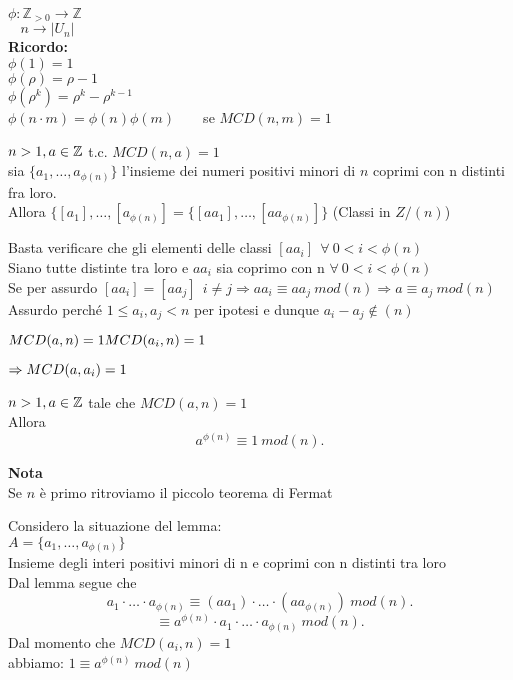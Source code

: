 \documentclass[12px]{article}
\begin{document}
	$\phi: \mathbb Z_{>0} \rightarrow \mathbb Z$\\
	$\text{} \ \ \ \ n \rightarrow |U_n|$\\
	\textbf{Ricordo:}\\
	$\phi(1) = 1$\\
	 $\phi(\rho) = \rho -1$\\
	 $\phi(\rho^k) = \rho^k - \rho ^{k-1}$\\
	 $\phi(n\cdot m) = \phi(n)\phi(m)$\ \ \ \ se  $MCD(n,m) = 1$\\
	  \begin{lemm}
	 	$n>1, a\in\mathbb{Z}$ t.c.  $MCD(n,a) = 1$\\
		sia  $\{a_1,\ldots,a_{\phi(n)}\}$ l'insieme dei numeri positivi minori di $n$ coprimi con n distinti fra loro.\\
		Allora $\{[a_1],\ldots,[a_{\phi(n)}] = \{[aa_1],\ldots, [aa_{\phi(n)}]\}$ (Classi in $Z/(n)$)
	 \end{lemm}
	 \begin{dimo}
		 Basta verificare che gli elementi delle classi $[aa_i] \ \ \forall \ 0<i<\phi(n)$\\
		 Siano tutte distinte tra loro e  $aa_i$ sia coprimo con n  $\forall \ 0<i<\phi(n)$ \\
		 Se per assurdo $[aa_i] = [aa_j] \ \ i\neq j \Rightarrow aa_i\equiv aa_j\  mod(n) \Rightarrow a\equiv a_j \ mod(n)$ Assurdo perché $1\leq a_i, a_j< n$ per ipotesi e dunque  $a_i-a_j\not\in (n)$\\
		 \begin{cases}
		  $MCD(a,n) = 1 \\ MCD(a_i,n) = 1$
		 \end{cases} $\Rightarrow MCD(a,a_i) = 1\\$
	 \end{dimo}
	 \begin{teo}[Eulero 1760]
	 	$n>1 ,a\in\mathbb{Z}$ tale che $MCD(a,n) = 1$\\
		Allora
		 \[
			 a^{\phi(n)}\equiv 1\  mod(n)
		.\] 
	 \end{teo}
	 \textbf{Nota}\\
	 Se $n$ è primo ritroviamo il piccolo teorema di Fermat
	 \begin{dimo}
	 	Considero la situazione del lemma:\\
		$A = \{a_1,\ldots,a_{\phi(n)}\}$\\
			Insieme degli interi positivi minori di n e coprimi con n distinti tra loro\\
			Dal lemma segue che
			\[
				a_1\cdot\ldots\cdot a_{\phi(n)}\equiv (aa_1)\cdot\ldots\cdot (aa_{\phi(n)}) \ mod(n)
			.\] 
			\[
				\equiv a^{\phi(n)}\cdot a_1\cdot\ldots\cdot a_{\phi(n)} \ mod(n)
			.\] 
			Dal momento che $MCD(a_i,n) = 1$\\
			abbiamo:  $1\equiv a^{\phi(n)}\ mod(n)$
	 \end{dimo}
\end{document}
